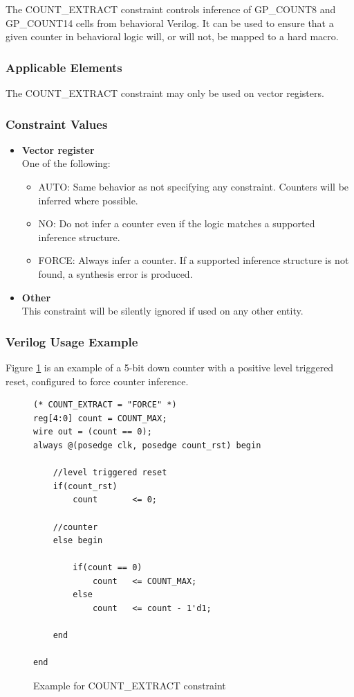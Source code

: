\documentclass[11pt]{article}
\begin{document}
The COUNT\_EXTRACT constraint controls inference of GP\_COUNT8 and GP\_COUNT14 cells from behavioral Verilog. It can be 
used to ensure that a given counter in behavioral logic will, or will not, be mapped to a hard macro.

\subsubsection{Applicable Elements}
The COUNT\_EXTRACT constraint may only be used on vector registers.

\subsubsection{Constraint Values}
\begin{itemize}
\item {\bfseries Vector register}\\
One of the following:
\begin{itemize}
\item AUTO: Same behavior as not specifying any constraint. Counters will be inferred where possible.
\item NO: Do not infer a counter even if the logic matches a supported inference structure.
\item FORCE: Always infer a counter. If a supported inference structure is not found, a synthesis error is produced.
\end{itemize}
\item {\bfseries Other} \\
This constraint will be silently ignored if used on any other entity.
\end{itemize}

\clearpage
\subsubsection{Verilog Usage Example}

Figure \ref{constraint-count-extract} is an example of a 5-bit down counter with a positive level triggered reset, 
configured to force counter inference.

\begin{figure}[h]
\begin{lstlisting}
(* COUNT_EXTRACT = "FORCE" *)
reg[4:0] count = COUNT_MAX;
wire out = (count == 0);
always @(posedge clk, posedge count_rst) begin
	
	//level triggered reset
	if(count_rst)
		count		<= 0;
	
	//counter
	else begin

		if(count == 0)
			count	<= COUNT_MAX;
		else
			count	<= count - 1'd1;

	end
	
end
\end{lstlisting}
\caption{Example for COUNT\_EXTRACT constraint}
\label{constraint-count-extract}
\end{figure}
\end{document}
